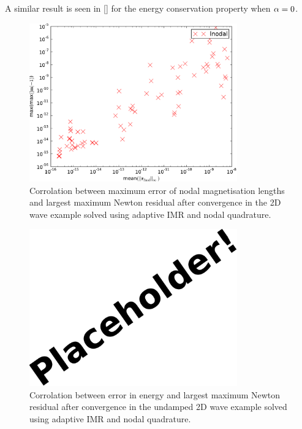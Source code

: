 A similar result is seen in \cref{} for the energy conservation property when $\alpha = 0$.

\begin{figure}
  \centering
  \includegraphics[width=0.8\textwidth]
  {plots/2d_wave_solution_m_length_newton_res/-maxmaxmathbfm-1vsmeanmathbfr_mathrmfinal_infty.pdf}
  \caption{Corrolation between maximum error of nodal magnetisation lengths and largest maximum Newton residual after convergence in the 2D wave example solved using adaptive IMR and nodal quadrature.}
  \label{fig:ml-error-2d-nodal-newton-tests}
\end{figure}


\begin{figure}
  \centering
  \includegraphics[width=0.8\textwidth] {images/placeholder}
  \caption{Corrolation between error in energy and largest maximum Newton residual after convergence in the undamped 2D wave example solved using adaptive IMR and nodal quadrature.}
  \label{fig:energy-error-2d-nodal-newton-tests}
\end{figure}



